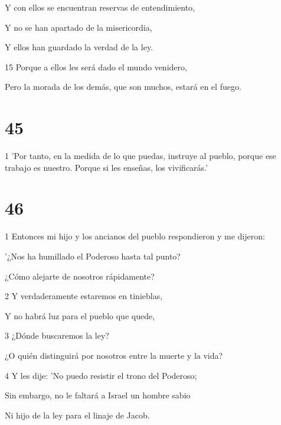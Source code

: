 \par Y con ellos se encuentran reservas de entendimiento,

\par Y no se han apartado de la misericordia,

\par Y ellos han guardado la verdad de la ley.

\par 15 Porque a ellos les será dado el mundo venidero,

\par Pero la morada de los demás, que son muchos, estará en el fuego.

\chapter{45}

\par 1 'Por tanto, en la medida de lo que puedas, instruye al pueblo, porque ese trabajo es nuestro. Porque si les enseñas, los vivificarás.'

\chapter{46}

\par 1 Entonces mi hijo y los ancianos del pueblo respondieron y me dijeron:

\par '¿Nos ha humillado el Poderoso hasta tal punto?

\par ¿Cómo alejarte de nosotros rápidamente?

\par 2 Y verdaderamente estaremos en tinieblas,

\par Y no habrá luz para el pueblo que quede,

\par 3 ¿Dónde buscaremos la ley?

\par ¿O quién distinguirá por nosotros entre la muerte y la vida?

\par 4 Y les dije: 'No puedo resistir el trono del Poderoso;

\par Sin embargo, no le faltará a Israel un hombre sabio

\par Ni hijo de la ley para el linaje de Jacob.

